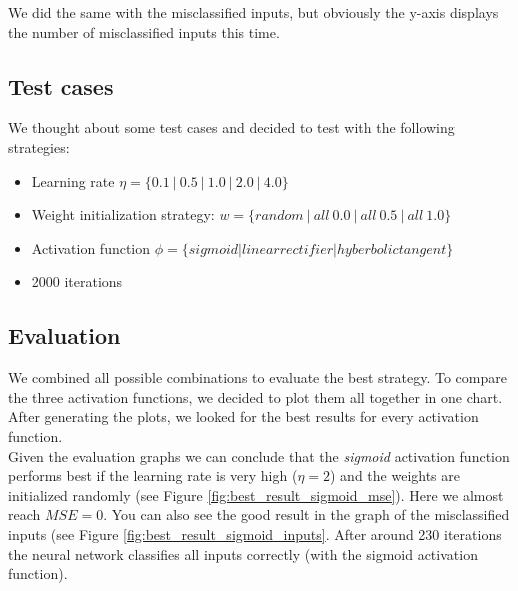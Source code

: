 \documentclass{article}
\begin{document}
We did the same with the misclassified inputs, but obviously the y-axis displays the number of misclassified inputs this time.

\subsection{Test cases}

We thought about some test cases and decided to test with the following strategies:

\begin{itemize}
\item{Learning rate $\eta = \{0.1\ |\ 0.5\ |\ 1.0\ |\ 2.0\ |\ 4.0 \}$}
\item{Weight initialization strategy: $w = \{ random\ |\ all\ 0.0\ |\ all\ 0.5\ |\ all\ 1.0\}$}
\item{Activation function $\phi = \{sigmoid | linear rectifier | hyberbolic tangent\}$}
\item{2000 iterations}
\end{itemize}

\subsection{Evaluation}
We combined all possible combinations to evaluate the best strategy.
To compare the three activation functions, we decided to plot them all together in one chart.
After generating the plots, we looked for the best results for every activation function.
\\

Given the evaluation graphs we can conclude that the \emph{sigmoid} activation function performs best if the learning rate is very high ($\eta = 2$) and the weights are initialized randomly (see Figure \ref{fig:best_result_sigmoid_mse}).  Here we almost reach $MSE = 0$. You can also see the good result in the graph of the misclassified inputs (see Figure \ref{fig:best_result_sigmoid_inputs}. After around 230 iterations the neural network classifies all inputs correctly (with the sigmoid activation function).
\end{document}
